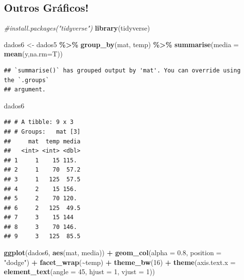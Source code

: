 \documentclass[
]{book}
\newenvironment{Shaded}{\begin{snugshade}}{\end{snugshade}}
\newcommand{\AttributeTok}[1]{\textcolor[rgb]{0.13,0.29,0.53}{#1}}
\newcommand{\CommentTok}[1]{\textcolor[rgb]{0.56,0.35,0.01}{\textit{#1}}}
\newcommand{\DecValTok}[1]{\textcolor[rgb]{0.00,0.00,0.81}{#1}}
\newcommand{\FloatTok}[1]{\textcolor[rgb]{0.00,0.00,0.81}{#1}}
\newcommand{\FunctionTok}[1]{\textcolor[rgb]{0.13,0.29,0.53}{\textbf{#1}}}
\newcommand{\NormalTok}[1]{#1}
\newcommand{\OtherTok}[1]{\textcolor[rgb]{0.56,0.35,0.01}{#1}}
\newcommand{\SpecialCharTok}[1]{\textcolor[rgb]{0.81,0.36,0.00}{\textbf{#1}}}
\newcommand{\StringTok}[1]{\textcolor[rgb]{0.31,0.60,0.02}{#1}}
\begin{document}
\subsection{Outros Gráficos!}\label{outros-gruxe1ficos}

\begin{Shaded}
\begin{Highlighting}[]
\CommentTok{\#install.packages("tidyverse")}
\FunctionTok{library}\NormalTok{(tidyverse)}

\NormalTok{dados6 }\OtherTok{\textless{}{-}}\NormalTok{ dados5 }\SpecialCharTok{\%\textgreater{}\%}
  \FunctionTok{group\_by}\NormalTok{(mat, temp) }\SpecialCharTok{\%\textgreater{}\%}
  \FunctionTok{summarise}\NormalTok{(}\AttributeTok{media =} \FunctionTok{mean}\NormalTok{(y,}\AttributeTok{na.rm=}\NormalTok{T))}
\end{Highlighting}
\end{Shaded}

\begin{verbatim}
## `summarise()` has grouped output by 'mat'. You can override using the `.groups`
## argument.
\end{verbatim}

\begin{Shaded}
\begin{Highlighting}[]
\NormalTok{dados6}
\end{Highlighting}
\end{Shaded}

\begin{verbatim}
## # A tibble: 9 x 3
## # Groups:   mat [3]
##     mat  temp media
##   <int> <int> <dbl>
## 1     1    15 115. 
## 2     1    70  57.2
## 3     1   125  57.5
## 4     2    15 156. 
## 5     2    70 120. 
## 6     2   125  49.5
## 7     3    15 144  
## 8     3    70 146. 
## 9     3   125  85.5
\end{verbatim}

\begin{Shaded}
\begin{Highlighting}[]
\FunctionTok{ggplot}\NormalTok{(dados6, }\FunctionTok{aes}\NormalTok{(mat, media)) }\SpecialCharTok{+}
  \FunctionTok{geom\_col}\NormalTok{(}\AttributeTok{alpha =} \FloatTok{0.8}\NormalTok{, }\AttributeTok{position =} \StringTok{"dodge"}\NormalTok{) }\SpecialCharTok{+}
  \FunctionTok{facet\_wrap}\NormalTok{(}\SpecialCharTok{\textasciitilde{}}\NormalTok{temp) }\SpecialCharTok{+}
  \FunctionTok{theme\_bw}\NormalTok{(}\DecValTok{16}\NormalTok{) }\SpecialCharTok{+}
  \FunctionTok{theme}\NormalTok{(}\AttributeTok{axis.text.x =} \FunctionTok{element\_text}\NormalTok{(}\AttributeTok{angle =} \DecValTok{45}\NormalTok{, }\AttributeTok{hjust =} \DecValTok{1}\NormalTok{, }\AttributeTok{vjust =} \DecValTok{1}\NormalTok{))}
\end{Highlighting}
\end{Shaded}
\end{document}
